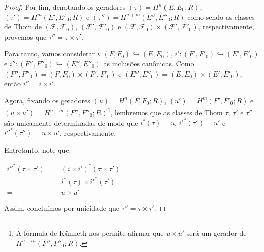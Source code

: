 \documentclass[12pt,oneside]{book} %
\begin{document}
\begin{proof}
	\par Por fim, denotando os geradores $(\tau)=H^{n}(E,E_{0};R)$, $(\tau')=H^{m}(E',E'_{0};R)$ e $(\tau'')=H^{n+m}(E'',E''_{0};R)$ como sendo as classes de Thom de $(\mathcal{F},\mathcal{F}_{0})$, $(\mathcal{F'},\mathcal{F'}_{0})$ e $(\mathcal{F},\mathcal{F}_{0})\times (\mathcal{F'},\mathcal{F'}_{0})$, respectivamente, provemos que $\tau''=\tau\times\tau'$.
	
	\par Para tanto, vamos considerar $i:(F,F_{0})\hookrightarrow (E,E_{0})$, $i':(F',F'_{0})\hookrightarrow (E',E'_{0})$ e $i'':(F'',F''_{0})\hookrightarrow (E'',E''_{0})$ as inclusões canônicas. Como $(F'',F''_{0})=(F,F_{0})\times (F',F'_{0})$ e $(E'',E''_{0})=(E,E_{0})\times (E',E'_{0})$, então $i''=i\times i'$.
	
	\par Agora, fixando os geradores $(u)=H^{n}(F,F_{0};R)$, $(u')=H^{m}(F',F'_{0};R)$ e $(u\times u')=H^{n+m}(F'',F''_{0};R)$\footnote{A fórmula de Künneth nos permite afirmar que $u\times u'$ será um gerador de $H^{n+m}(F'',F''_{0};R)$.}, lembremos que as classes de Thom $\tau$, $\tau'$ e $\tau''$ são unicamente determinadas de modo que $i^{*}(\tau)=u$, $i'^{*}(\tau')=u'$ e $i''^{*}(\tau'')=u\times u'$, respectivamente.
	
	\par Entretanto, note que: \newline
	
	$\begin{array}{rl}
		i''^{*}(\tau\times\tau') \ = & (i\times i')^{*}(\tau\times\tau') \\
		= & i^{*}(\tau)\times i'^{*}(\tau') \\
		= & u\times u'
	\end{array}$ \newline
	
	\par Assim, concluímos por unicidade que $\tau''=\tau\times\tau'$.
	
\end{proof}
\end{document}
